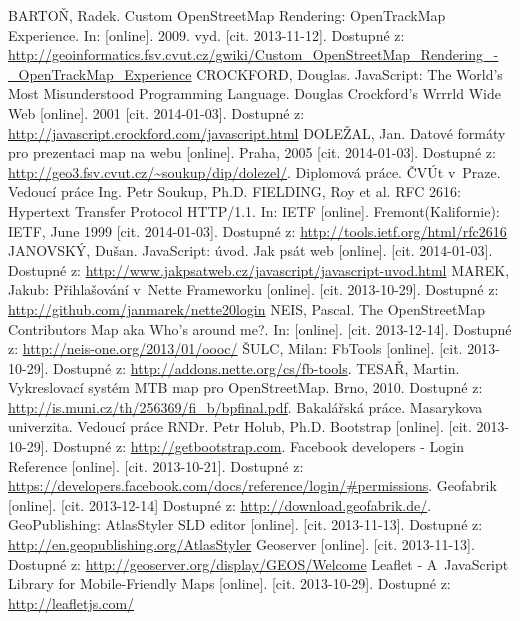 \documentclass[11pt,a4paper,titlepage,oneside]{book}
\begin{document}
\newpage
{}
\begin{thebibliography}{99}
	 BARTOŇ, Radek. Custom OpenStreetMap Rendering: OpenTrackMap Experience. In: [online]. 2009. vyd. [cit. 2013-11-12]. Dostupné z:  \url{http://geoinformatics.fsv.cvut.cz/gwiki/Custom_OpenStreetMap_Rendering_-_OpenTrackMap_Experience}
	CROCKFORD, Douglas. JavaScript: The World's Most Misunderstood Programming Language. Douglas Crockford's Wrrrld Wide Web [online]. 2001 [cit. 2014-01-03]. Dostupné z: \url{http://javascript.crockford.com/javascript.html}
	DOLEŽAL, Jan. Datové formáty pro prezentaci map na webu [online]. Praha, 2005 [cit. 2014-01-03]. Dostupné z: \url{http://geo3.fsv.cvut.cz/~soukup/dip/dolezel/}. Diplomová práce. ČVÚt v~Praze. Vedoucí práce Ing. Petr Soukup, Ph.D.
	FIELDING, Roy et al. RFC 2616: Hypertext Transfer Protocol HTTP/1.1. In: IETF [online]. Fremont(Kalifornie): IETF, June 1999 [cit. 2014-01-03]. Dostupné z: \url{http://tools.ietf.org/html/rfc2616}
        JANOVSKÝ, Dušan. JavaScript: úvod. Jak psát web [online]. [cit. 2014-01-03]. Dostupné z: \url{http://www.jakpsatweb.cz/javascript/javascript-uvod.html}
	MAREK, Jakub: Přihlašování v~Nette Frameworku [online].  [cit. 2013-10-29]. Dostupné z: \url{http://github.com/janmarek/nette20login}
	NEIS, Pascal. The OpenStreetMap Contributors Map aka Who’s around me?. In: [online]. [cit. 2013-12-14]. Dostupné z: \url{http://neis-one.org/2013/01/oooc/}
	 ŠULC, Milan: FbTools [online].  [cit. 2013-10-29]. Dostupné z: \url{http://addons.nette.org/cs/fb-tools}.
	TESAŘ, Martin. Vykreslovací systém MTB map pro OpenStreetMap. Brno, 2010. Dostupné z: \url{http://is.muni.cz/th/256369/fi_b/bpfinal.pdf}. Bakalářská práce. Masarykova univerzita. Vedoucí práce RNDr. Petr Holub, Ph.D.
	Bootstrap [online].  [cit. 2013-10-29]. Dostupné z: \url{http://getbootstrap.com}.
	 Facebook developers - Login Reference [online]. [cit. 2013-10-21]. Dostupné z: \url{https://developers.facebook.com/docs/reference/login/#permissions}.
	Geofabrik [online]. [cit. 2013-12-14] Dostupné z: \url{http://download.geofabrik.de/}.
	GeoPublishing: AtlasStyler SLD editor [online]. [cit. 2013-11-13]. Dostupné z: \url{http://en.geopublishing.org/AtlasStyler}
	Geoserver [online]. [cit. 2013-11-13]. Dostupné z: \url{http://geoserver.org/display/GEOS/Welcome}
		Leaflet - A~JavaScript Library for Mobile-Friendly Maps [online]. [cit. 2013-10-29]. Dostupné z: \url{http://leafletjs.com/}

\end{thebibliography}
\end{document}

